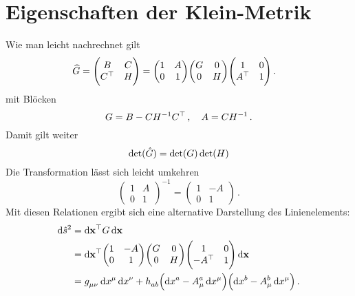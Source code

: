 \section{Eigenschaften der Klein-Metrik}
Wie man leicht nachrechnet gilt
\begin{equation}
\begin{split}
\widehat{G}=\begin{pmatrix}B& C\\
C\transpose& H\end{pmatrix}
&=
\begin{pmatrix}1& A\\0& 1\end{pmatrix}
\begin{pmatrix}G& 0\\0& H
\end{pmatrix}
\begin{pmatrix}1& 0\\A\transpose& 1\end{pmatrix}\,.
\end{split}
\end{equation}
mit Blöcken 
\begin{equation}
G=B-CH^{-1}C^\top\,,\quad A=CH^{-1}\,.
\end{equation}
Damit gilt weiter
\begin{equation}
\det(\hat{G})=\det(G)\det(H)
\end{equation}
Die Transformation lässt sich leicht umkehren
\begin{equation}
\begin{pmatrix}1& A\\0& 1\end{pmatrix}^{-1}=\begin{pmatrix}1& -A\\0&
1\end{pmatrix}\,.
\end{equation}
Mit diesen Relationen ergibt sich eine alternative Darstellung des
Linienelements:
\begin{equation}
\begin{split}
\dif \fived{s}^2&=\dif \vec{x}\transpose G
\dif \vec{x}\\
&=\dif \vec{x}\transpose
\begin{pmatrix}1& -A\\0& 1\end{pmatrix}
\begin{pmatrix}G& 0\\0& H
\end{pmatrix}
\begin{pmatrix}1& 0\\-A\transpose& 1\end{pmatrix}
\dif \vec{x}\\
&=\tensor{g}{_\mu_\nu}\dif \tensor{x}{^\mu}\dif\tensor{x}{^\nu}
+\tensor{h}{_a_b}\left(\dif\tensor{x}{^a}-\tensor*{A}{^a_\mu}\dif\tensor{x}{^\mu}\right)
\left(\dif\tensor{x}{^b}-\tensor*{A}{^b_\mu}\dif\tensor{x}{^\mu}\right)\,.
\end{split}
\end{equation}
